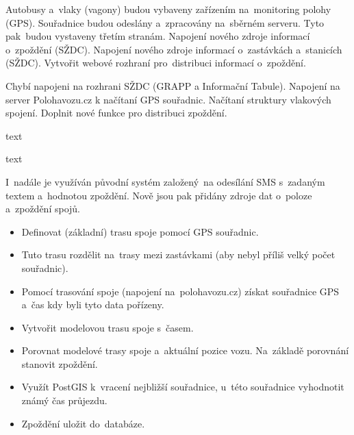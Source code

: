 
Autobusy a~vlaky (vagony) budou vybaveny zařízením na~monitoring polohy (GPS).
Souřadnice budou odeslány a~zpracovány na~sběrném serveru. Tyto pak~budou vystaveny třetím stranám.
Napojení nového zdroje informací o~zpoždění (SŽDC). Napojení nového zdroje informací o~zastávkách a~stanicích (SŽDC). Vytvořit webové rozhraní pro~distribuci informací o~zpoždění.


Chybí napojeni na rozhrani SŽDC (GRAPP a Informační Tabule). Napojení na server Polohavozu.cz k načítaní GPS souřadnic. Načítaní struktury vlakových spojení. Doplnit nové funkce pro distribuci zpoždění.

text

text

I~nadále je využíván původní systém založený~na odesílání SMS s~zadaným textem a~hodnotou zpoždění. Nově jsou pak přidány zdroje dat o~poloze a~zpoždění spojů.

\begin{itemize}
	\item Definovat (základní) trasu spoje pomocí GPS souřadnic.
	\item Tuto trasu rozdělit na~trasy mezi zastávkami (aby nebyl příliš velký počet souřadnic).
	\item Pomocí trasování spoje (napojení na~polohavozu.cz) získat souřadnice GPS a~čas kdy byli tyto data pořízeny.
	\item Vytvořit modelovou trasu spoje s~časem.
	\item Porovnat modelové trasy spoje a~aktuální pozice vozu. Na~základě porovnání stanovit zpoždění.
	\item Využít PostGIS k~vracení nejbližší souřadnice, u~této souřadnice vyhodnotit známý čas průjezdu.
	\item Zpoždění uložit do~databáze.
\end{itemize}

